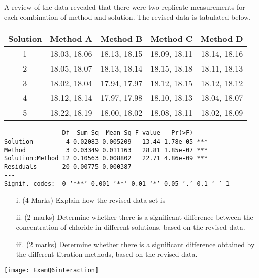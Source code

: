 \item[(b)] A review of the data revealed that there were two replicate measurements for each combination of method and solution. The revised data is tabulated below.

    \begin{tabular}{|c|c|c|c|c|}
      \hline

      Solution &  Method A & Method B & Method C & Method D \\\hline
1&	18.03, 18.06	&	18.13, 18.15	&	18.09, 18.11	&	18.14, 18.16	\\
2&	18.05, 18.07	&	18.13, 18.14	&	18.15, 18.18	&	18.11, 18.13	\\
3&	18.02, 18.04	&	17.94, 17.97	&	18.12, 18.15	&	18.12, 18.12	\\
4&	18.12, 18.14	&	17.97, 17.98	&	18.10, 18.13	&	18.04, 18.07	\\
5&	18.22, 18.19	&	18.00, 18.02	&	18.08, 18.11	&	18.02, 18.09	\\
      \hline
    \end{tabular}

\begin{framed}
\begin{verbatim}
                Df  Sum Sq  Mean Sq F value   Pr(>F)
Solution         4 0.02083 0.005209   13.44 1.78e-05 ***
Method           3 0.03349 0.011163   28.81 1.85e-07 ***
Solution:Method 12 0.10563 0.008802   22.71 4.86e-09 ***
Residuals       20 0.00775 0.000387
---
Signif. codes:  0 ‘***’ 0.001 ‘**’ 0.01 ‘*’ 0.05 ‘.’ 0.1 ‘ ’ 1
\end{verbatim}
\end{framed}

\begin{itemize}
\item[i.] (4 Marks) Explain how the revised data set is
\item[ii.] (2 marks) Determine whether there is a significant difference between the concentration of chloride in different solutions, based on the revised data.
\item[iii.] (2 marks) Determine whether there is a  significant difference obtained by the different titration methods, based on the revised data.

\end{itemize}




\begin{center}
\texttt{[image: ExamQ6interaction]}
\end{center}
\newpage

